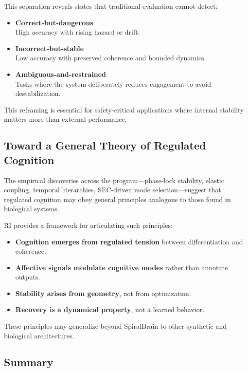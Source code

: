 \documentclass[12pt,a4paper]{report}
\begin{document}
This separation reveals states that traditional evaluation cannot detect:

\begin{itemize}
    \item \textbf{Correct‑but‑dangerous} \\
    High accuracy with rising hazard or drift.

    \item \textbf{Incorrect‑but‑stable} \\
    Low accuracy with preserved coherence and bounded dynamics.

    \item \textbf{Ambiguous‑and‑restrained} \\
    Tasks where the system deliberately reduces engagement to avoid destabilization.
\end{itemize}

This reframing is essential for safety‑critical applications where internal stability matters more than external performance.

\subsection{Toward a General Theory of Regulated Cognition}

The empirical discoveries across the program—phase‑lock stability, elastic coupling, temporal hierarchies, SEC‑driven mode selection—suggest that regulated cognition may obey general principles analogous to those found in biological systems.

RI provides a framework for articulating such principles:

\begin{itemize}
    \item \textbf{Cognition emerges from regulated tension} between differentiation and coherence.
    \item \textbf{Affective signals modulate cognitive modes} rather than annotate outputs.
    \item \textbf{Stability arises from geometry}, not from optimization.
    \item \textbf{Recovery is a dynamical property}, not a learned behavior.
\end{itemize}

These principles may generalize beyond SpiralBrain to other synthetic and biological architectures.

\subsection{Summary}
\end{document}
